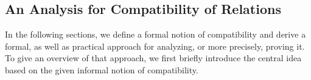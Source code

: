 


\subsection{An Analysis for Compatibility of Relations}

In the following sections, we define a formal notion of compatibility and derive a formal, as well as practical approach for analyzing, or more precisely, proving it.
To give an overview of that approach, we first briefly introduce the central idea based on the given informal notion of compatibility.

